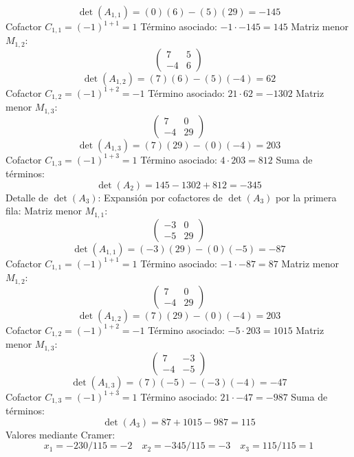 \documentclass{article}
\begin{document}
\[\det(A_{1,1}) = (0)(6) - (5)(29) = -145\]
Cofactor $C_{1,1} = (-1)^{1+1} = 1$
Término asociado: $ -1 \cdot -145 = 145 $
Matriz menor $M_{1,2}$:
\[\begin{pmatrix}7 & 5 \\ -4 & 6\end{pmatrix}\]
\[\det(A_{1,2}) = (7)(6) - (5)(-4) = 62\]
Cofactor $C_{1,2} = (-1)^{1+2} = -1$
Término asociado: $ 21 \cdot 62 = -1302 $
Matriz menor $M_{1,3}$:
\[\begin{pmatrix}7 & 0 \\ -4 & 29\end{pmatrix}\]
\[\det(A_{1,3}) = (7)(29) - (0)(-4) = 203\]
Cofactor $C_{1,3} = (-1)^{1+3} = 1$
Término asociado: $ 4 \cdot 203 = 812 $
Suma de términos:
\[\det(A_{2}) = 145 - 1302 + 812 = -345\]
Detalle de $\det(A_{3})$:
Expansión por cofactores de $\det(A_{3})$ por la primera fila:
Matriz menor $M_{1,1}$:
\[\begin{pmatrix}-3 & 0 \\ -5 & 29\end{pmatrix}\]
\[\det(A_{1,1}) = (-3)(29) - (0)(-5) = -87\]
Cofactor $C_{1,1} = (-1)^{1+1} = 1$
Término asociado: $ -1 \cdot -87 = 87 $
Matriz menor $M_{1,2}$:
\[\begin{pmatrix}7 & 0 \\ -4 & 29\end{pmatrix}\]
\[\det(A_{1,2}) = (7)(29) - (0)(-4) = 203\]
Cofactor $C_{1,2} = (-1)^{1+2} = -1$
Término asociado: $ -5 \cdot 203 = 1015 $
Matriz menor $M_{1,3}$:
\[\begin{pmatrix}7 & -3 \\ -4 & -5\end{pmatrix}\]
\[\det(A_{1,3}) = (7)(-5) - (-3)(-4) = -47\]
Cofactor $C_{1,3} = (-1)^{1+3} = 1$
Término asociado: $ 21 \cdot -47 = -987 $
Suma de términos:
\[\det(A_{3}) = 87 + 1015 - 987 = 115\]
Valores mediante Cramer:
\[x_1 = -230/115 = -2\quad x_2 = -345/115 = -3\quad x_3 = 115/115 = 1\]
\end{document}
